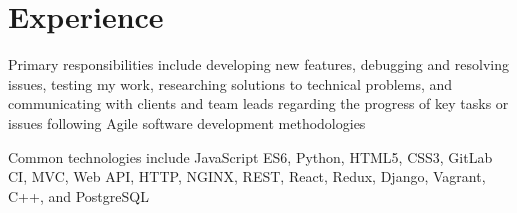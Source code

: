\documentclass[letterpaper]{deedy-resume} %
\begin{document}
\begin{minipage}[t]{0.66\textwidth} %

\section{Experience}


\vspace{\topsep} %
\begin{tightitemize}
\item Primary responsibilities include developing new features, debugging and resolving issues, testing my work, researching solutions to technical problems, and communicating with clients and team leads regarding the progress of key tasks or issues following Agile software development methodologies
\item  Common technologies include JavaScript ES6, Python, HTML5, CSS3, GitLab CI, MVC, Web API, HTTP, NGINX, REST, React, Redux, Django, Vagrant, C++, and PostgreSQL
\end{tightitemize}

\sectionspace %





\end{minipage}
\end{document}
